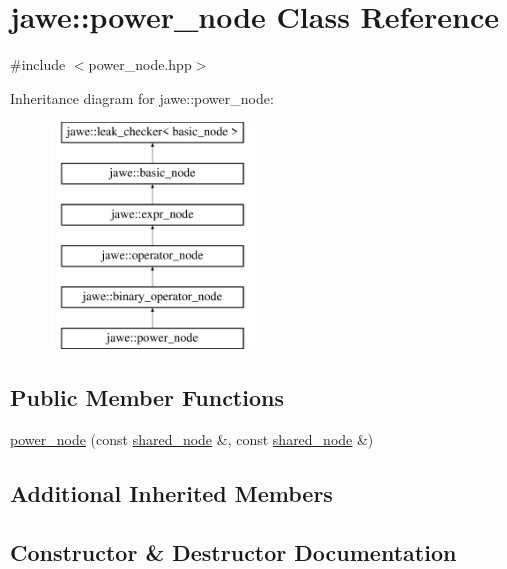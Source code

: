 \hypertarget{classjawe_1_1power__node}{}\section{jawe\+:\+:power\+\_\+node Class Reference}
\label{classjawe_1_1power__node}


{\ttfamily \#include $<$power\+\_\+node.\+hpp$>$}

Inheritance diagram for jawe\+:\+:power\+\_\+node\+:\begin{figure}[H]
\begin{center}
\leavevmode
\includegraphics[height=6.000000cm]{classjawe_1_1power__node}
\end{center}
\end{figure}
\subsection*{Public Member Functions}
\begin{DoxyCompactItemize}
\item 
\hyperlink{classjawe_1_1power__node_afdd2f0d973a9ed20da9c6686e21cb410}{power\+\_\+node} (const \hyperlink{namespacejawe_a3f307481d921b6cbb50cc8511fc2b544}{shared\+\_\+node} \&, const \hyperlink{namespacejawe_a3f307481d921b6cbb50cc8511fc2b544}{shared\+\_\+node} \&)
\end{DoxyCompactItemize}
\subsection*{Additional Inherited Members}


\subsection{Constructor \& Destructor Documentation}
\mbox{\label{classjawe_1_1power__node_afdd2f0d973a9ed20da9c6686e21cb410}} 
